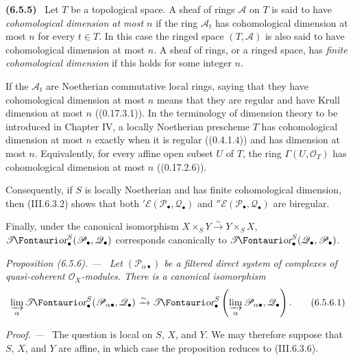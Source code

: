 \documentclass[10pt,oneside]{book}
\newcommand{\sh}[1]{\mathscr{#1}}
\newcommand{\shTor}{\sh{T}\textup{\kern-2.2pt{\Fontauri\slshape or}}}
\newcommand{\sref}[2][]{(#2)}
\newcommand{\oldpage}[2][]{\setcounter{footnote}{0}\marginpar{\scriptsize\textbf{#1}~|~#2}\ignorespaces}
\newenvironment{env}[1][]{\par\medskip\noindent\textbf{(#1)}\ }{\par}
\newenvironment{proposition}[1][]{\par\medskip\noindent\itshape Proposition (#1). ---\ }{\par}
\newenvironment{proof}{\par\medskip\noindent\textit{Proof. ---\ }}{\par}
\begin{document}
\begin{env}[6.5.5]
\label{III.6.5.5}
Let $T$ be a topological space.  A sheaf of rings $\sh A$ on $T$
is said to have \emph{cohomological dimension at most $n$} if the
ring $\sh A_t$ has cohomological dimension at most $n$ for every
$t\in T$.  In this case the ringed space $(T,\sh A)$ is also said
to have cohomological dimension at most $n$.  A sheaf of rings, or
a ringed space, has \emph{finite cohomological dimension} if this
holds for some integer $n$.

If the $\sh A_t$ are Noetherian commutative local rings, saying
that they have cohomological dimension at most $n$ means that
they are regular and have Krull dimension at most $n$
\oldpage[III]{150}
(\sref[0]{0.17.3.1}).  In the terminology of dimension theory to
be introduced in Chapter IV, a locally Noetherian prescheme $T$ has
cohomological dimension at most $n$ exactly when it is regular
(\sref[0]{0.4.1.4}) and has dimension at most $n$.  Equivalently,
for every affine open subset $U$ of $T$, the ring
$\Gamma(U,\sh O_T)$ has cohomological dimension at most $n$
(\sref[0]{0.17.2.6}).

Consequently, if $S$ is locally Noetherian and has finite
cohomological dimension, then \sref{III.6.3.2} shows that both
$'\sh E(\sh P_\bullet,\sh Q_\bullet)$ and
$''\sh E(\sh P_\bullet,\sh Q_\bullet)$ are biregular.

Finally, under the canonical isomorphism
$X\times_SY\xrightarrow{\sim}Y\times_SX$,
$\shTor_\bullet^S(\sh P_\bullet,\sh Q_\bullet)$ corresponds
canonically to
$\shTor_\bullet^S(\sh Q_\bullet,\sh P_\bullet)$.
\end{env}

\begin{proposition}[6.5.6]
\label{III.6.5.6}
Let $(\sh P_{\alpha\bullet})$ be a filtered direct system of
complexes of quasi-coherent $\sh O_X$-modules.  There is a
canonical isomorphism
\[
  \varinjlim_\alpha
  \shTor_\bullet^S(\sh P_{\alpha\bullet},\sh Q_\bullet)
  \xrightarrow{\sim}
  \shTor_\bullet^S
  \left(\varinjlim_\alpha\sh P_{\alpha\bullet},\sh Q_\bullet\right).
  \tag{6.5.6.1}\label{III.6.5.6.1}
\]
\end{proposition}

\begin{proof}
The question is local on $S$, $X$, and $Y$.  We may therefore
suppose that $S$, $X$, and $Y$ are affine, in which case the
proposition reduces to \sref{III.6.3.6}.
\end{proof}
\end{document}
